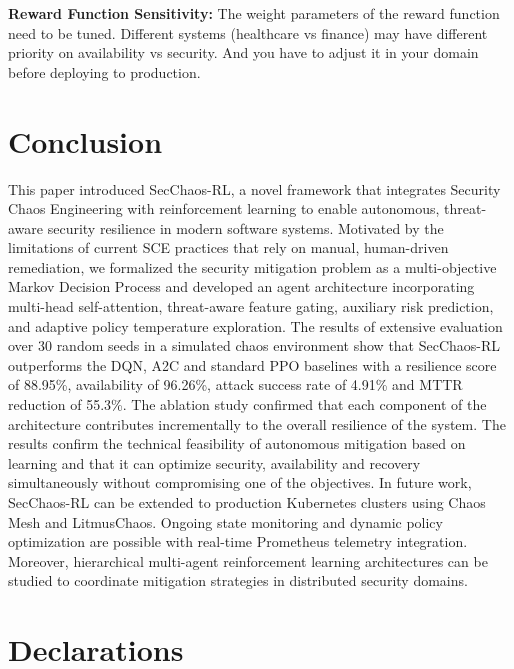 \documentclass[pdflatex,sn-mathphys-num]{sn-jnl}%
\theoremstyle{thmstyleone}%
\theoremstyle{thmstyletwo}%
\theoremstyle{thmstylethree}%
\begin{document}
	\textbf{Reward Function Sensitivity:} The weight parameters of the reward function need to be tuned. Different systems (healthcare vs finance) may have different priority on availability vs security. And you have to adjust it in your domain before deploying to production. 
	
	
	\section{Conclusion}
	
	This paper introduced SecChaos-RL, a novel framework that integrates Security Chaos Engineering with reinforcement learning to enable autonomous, threat-aware security resilience in modern software systems. Motivated by the limitations of current SCE practices that rely on manual, human-driven remediation, we formalized the security mitigation problem as a multi-objective Markov Decision Process and developed an agent architecture incorporating multi-head self-attention, threat-aware feature gating, auxiliary risk prediction, and adaptive policy temperature exploration. The results of extensive evaluation over 30 random seeds in a simulated chaos environment show that SecChaos-RL outperforms the DQN, A2C and standard PPO baselines with a resilience score of 88.95\%, availability of 96.26\%, attack success rate of 4.91\% and MTTR reduction of 55.3\%. The ablation study confirmed that each component of the architecture contributes incrementally to the overall resilience of the system. The results confirm the technical feasibility of autonomous mitigation based on learning and that it can optimize security, availability and recovery simultaneously without compromising one of the objectives. 
	In future work, SecChaos-RL can be extended to production Kubernetes clusters using Chaos Mesh and LitmusChaos. Ongoing state monitoring and dynamic policy optimization are possible with real-time Prometheus telemetry integration. Moreover, hierarchical multi-agent reinforcement learning architectures can be studied to coordinate mitigation strategies in distributed security domains.
	
	

	\section*{ Declarations}
	
\end{document}
